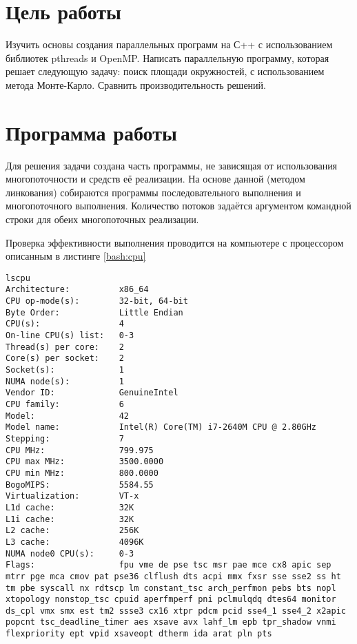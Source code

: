 







\section{Цель работы}
Изучить основы создания параллельных программ на С++ с использованием библиотек pthreads и OpenMP. Написать параллельную программу, которая решает следующую задачу: поиск площади окружностей, с использованием метода Монте-Карло. Сравнить производительность решений.


\section{Программа работы}
Для решения задачи создана часть программы, не зависящая от использования многопоточности и средств её реализации. На основе данной (методом линкования) собираются программы последовательного выполнения и многопоточного выполнения. Количество потоков задаётся аргументом командной строки для обеих многопоточных реализации.

Проверка эффективности выполнения проводится на компьютере с процессором описанным в листинге \ref{bash:cpu}

\begin{lstlisting}[label=bash:cpu]
lscpu
Architecture:          x86_64
CPU op-mode(s):        32-bit, 64-bit
Byte Order:            Little Endian
CPU(s):                4
On-line CPU(s) list:   0-3
Thread(s) per core:    2
Core(s) per socket:    2
Socket(s):             1
NUMA node(s):          1
Vendor ID:             GenuineIntel
CPU family:            6
Model:                 42
Model name:            Intel(R) Core(TM) i7-2640M CPU @ 2.80GHz
Stepping:              7
CPU MHz:               799.975
CPU max MHz:           3500.0000
CPU min MHz:           800.0000
BogoMIPS:              5584.55
Virtualization:        VT-x
L1d cache:             32K
L1i cache:             32K
L2 cache:              256K
L3 cache:              4096K
NUMA node0 CPU(s):     0-3
Flags:                 fpu vme de pse tsc msr pae mce cx8 apic sep mtrr pge mca cmov pat pse36 clflush dts acpi mmx fxsr sse sse2 ss ht tm pbe syscall nx rdtscp lm constant_tsc arch_perfmon pebs bts nopl xtopology nonstop_tsc cpuid aperfmperf pni pclmulqdq dtes64 monitor ds_cpl vmx smx est tm2 ssse3 cx16 xtpr pdcm pcid sse4_1 sse4_2 x2apic popcnt tsc_deadline_timer aes xsave avx lahf_lm epb tpr_shadow vnmi flexpriority ept vpid xsaveopt dtherm ida arat pln pts
\end{lstlisting}

